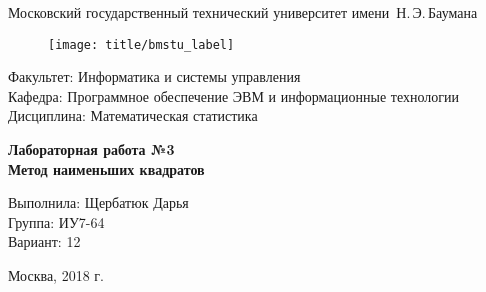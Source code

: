 
\thispagestyle{empty}

\begin{center}
    \Large
    Московский государственный технический университет имени~Н.\,Э.\,Баумана
\end{center}

\begin{figure}[h!]
    \begin{center}
        \texttt{[image: title/bmstu\_label]}
    \end{center}
\end{figure}

{\large
\noindent
Факультет: Информатика и системы управления\\[2mm]
\noindent
Кафедра: Программное обеспечение ЭВМ и информационные технологии\\[2mm]
\noindent
Дисциплина: Математическая статистика
\vspace{1.5cm}}

\begin{center}
    \Large
    \textbf{Лабораторная работа №3} \\
    \textbf{Метод наименьших квадратов} \\
\end{center}
\vfill

\hfill\begin{minipage}{0.35\textwidth}
    Выполнила: Щербатюк Дарья\\
    Группа: ИУ7-64\\
    Вариант: 12
\end{minipage}
\vfill

\begin{center}
    Москва, 2018 г.
\end{center}